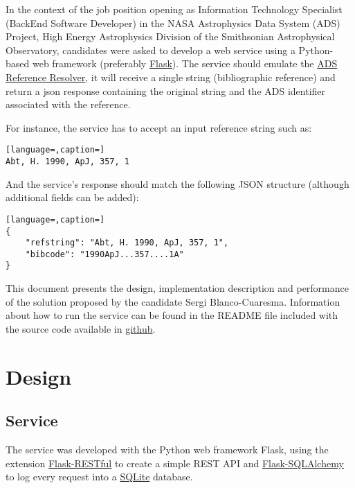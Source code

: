 \documentclass[a4paper,10pt,twoside]{article}
\begin{document}
In the context of the job position opening as Information Technology Specialist (Back­End Software Developer) in the NASA Astrophysics Data System (ADS) Project, High Energy Astrophysics Division of the Smithsonian Astrophysical Observatory, candidates were asked to develop a web service using a Python-based web framework (preferably \href{http://flask.pocoo.org/}{Flask}). The service should emulate the \href{http://adsres.cfa.harvard.edu/cgi-bin/refcgi.py}{ADS Reference Resolver}, it will receive a single string (bibliographic reference) and return a json response containing the original string and the ADS identifier associated with the reference.

For instance, the service has to accept an input reference string such as:

\begin{lstlisting}[language=,caption=]
Abt, H. 1990, ApJ, 357, 1
\end{lstlisting}

And the service's response should match the following JSON structure (although additional fields can be added):

\begin{lstlisting}[language=,caption=]
{
    "refstring": "Abt, H. 1990, ApJ, 357, 1",
    "bibcode": "1990ApJ...357....1A"
}
\end{lstlisting}


This document presents the design, implementation description and performance of the solution proposed by the candidate Sergi Blanco-Cuaresma. Information about how to run the service can be found in the README file included with the source code available in \href{https://github.com/marblestation/ADSBackEndTask}{github}.


\section{Design}

\subsection{Service}

The service was developed with the Python web framework Flask, using the extension \href{https://flask-restful.readthedocs.io/en/latest/}{Flask-RESTful} to create a simple REST API and \href{http://flask-sqlalchemy.pocoo.org/}{Flask-SQLAlchemy} to log every request into a \href{https://sqlite.org/}{SQLite} database.
\end{document}
